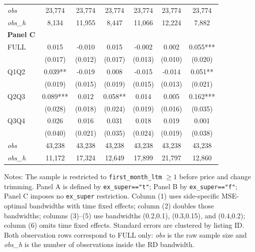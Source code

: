\begin{table}[!htbp]
\begin{tabular}{lcccccc}
\textit{obs} & 23,774 & 23,774 & 23,774 & 23,774 & 23,774 & 23,774 \\
\textit{obs\_h} &  8,134 & 11,955 &  8,447 & 11,066 & 12,224 &  7,882 \\

\textbf{Panel C} &&&&&&  \\

FULL & 0.015 & -0.010 & 0.015 & -0.002 & 0.002 & 0.055*** \\
 & (0.017) & (0.012) & (0.017) & (0.013) & (0.010) & (0.020) \\
Q1Q2 & 0.039** & -0.019 & 0.008 & -0.015 & -0.014 & 0.051** \\
 & (0.019) & (0.015) & (0.019) & (0.015) & (0.013) & (0.021) \\
Q2Q3 & 0.089*** & 0.012 & 0.058** & 0.014 & 0.005 & 0.162*** \\
 & (0.028) & (0.018) & (0.024) & (0.019) & (0.016) & (0.035) \\
Q3Q4 & 0.026 & 0.016 & 0.031 & 0.018 & 0.019 & 0.001 \\
 & (0.040) & (0.021) & (0.035) & (0.024) & (0.019) & (0.038) \\

\textit{obs} & 43,238 & 43,238 & 43,238 & 43,238 & 43,238 & 43,238 \\
\textit{obs\_h} & 11,172 & 17,324 & 12,649 & 17,899 & 21,797 & 12,860 \\

\bottomrule
\end{tabular}
\begin{minipage}{0.98\textwidth}\footnotesize
Notes: The sample is restricted to \texttt{first\_month\_ltm} $\geq 1$ before price and change trimming. Panel A is defined by \texttt{ex\_super=="t"}; Panel B by \texttt{ex\_super=="f"}; Panel C imposes no \texttt{ex\_super} restriction. Column (1) uses side-specific MSE-optimal bandwidths with time fixed effects; column (2) doubles those bandwidths; columns (3)--(5) use bandwidths (0.2,0.1), (0.3,0.15), and (0.4,0.2); column (6) omits time fixed effects. Standard errors are clustered by listing ID. Both observation rows correspond to FULL only: \textit{obs} is the raw sample size and \textit{obs\_h} is the number of observations inside the RD bandwidth.
\end{minipage}
\end{table}
\clearpage

